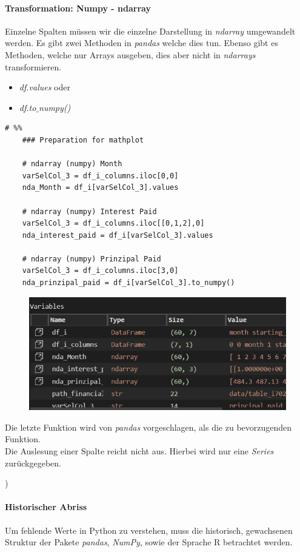 \paragraph{Transformation: Numpy - ndarray} 
Einzelne Spalten müssen wir die einzelne Darstellung in \textit{ndarray} umgewandelt werden. Es gibt zwei Methoden in \textit{pandas} welche dies tun. Ebenso gibt es Methoden, welche nur Arrays ausgeben, dies aber nicht in \textit{ndarrays} transformieren.
\begin{itemize}
	\item \textit{df.values} oder 
	\item \textit{df.to$\_$numpy()}
\end{itemize}
\begin{lstlisting}[style=Python]
	# %%
	### Preparation for mathplot
	
	# ndarray (numpy) Month
	varSelCol_3 = df_i_columns.iloc[0,0]
	nda_Month = df_i[varSelCol_3].values
	
	# ndarray (numpy) Interest Paid
	varSelCol_3 = df_i_columns.iloc[[0,1,2],0]
	nda_interest_paid = df_i[varSelCol_3].values
	
	# ndarray (numpy) Prinzipal Paid
	varSelCol_3 = df_i_columns.iloc[3,0]
	nda_prinzipal_paid = df_i[varSelCol_3].to_numpy()
\end{lstlisting}
\begin{figure}[H]
	\centering
	\includegraphics[scale = 0.8]{attachment/chapter_4/Scc004}
\end{figure}
Die letzte Funktion wird von \textit{pandas} vorgeschlagen, als die zu bevorzugenden Funktion. \\

Die Auslesung einer Spalte reicht nicht aus. Hierbei wird nur eine \textit{Series} zurückgegeben.

)
\paragraph{Historischer Abriss}
Um fehlende Werte in Python zu verstehen, muss die historisch, gewachsenen Struktur der Pakete \textit{pandas}, \textit{NumPy}, sowie der Sprache \gls{R} betrachtet werden.\\

